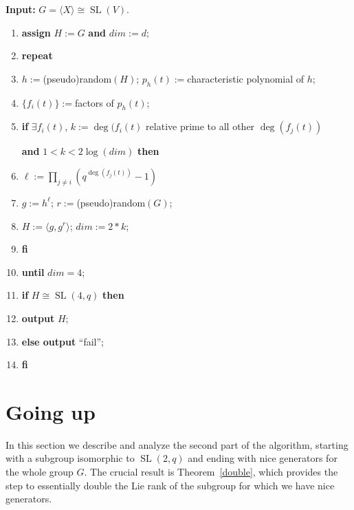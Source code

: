 \documentclass[a4paper,11pt]{article}
\def\SL{\operatorname{SL}}
\renewcommand{\bf}{\textbf} \renewcommand{\L}{\Lambda}
\begin{document}
\noindent
{\bf {Input:}} $G = \langle X \rangle \cong \SL(V)$.
\begin{enumerate}
\item {\bf {assign}} $H := G$ {\bf {and}} $dim := d$;
\item {\bf {repeat}} 
\item \hspace*{1cm} $h:=$(pseudo)random$(H)$; $p_h(t):=$characteristic
polynomial of $h$;
\item \hspace*{1cm} $\{ f_i(t) \}:=$factors of $p_h(t)$;
\item \hspace*{1cm} {\bf {if}} $\exists f_i(t)$, $k:=\deg(f_i(t)$
relative prime to all other $\deg(f_j(t))$

 \hspace*{2cm} {\bf {and}} $1<k<2 \log(dim)$ {\bf {then}}
\item \hspace*{2cm} $\ell:=\prod_{j \ne i} \left(q^{\deg(f_j(t))}-1\right)$
\item \hspace*{2cm} $g:=h^{\ell}$; $r:=$(pseudo)random$(G)$;
\item \hspace*{2cm} $H:=\langle g,g^r \rangle$; $dim := 2*k$;
\item \hspace*{1cm} {\bf {fi}}
\item {\bf {until}} $dim=4$;
\item {\bf {if}} $H \cong \SL(4,q)$ {\bf {then}}
\item \hspace*{1cm} {\bf {output}} $H$;
\item \hspace*{1cm} {\bf {else output}} ``fail'';
\item {\bf {fi}}
\end{enumerate}

\section{Going up}
\label{going up}

In this section we describe and analyze the second part of the
algorithm, starting with a subgroup isomorphic to $\SL(2,q)$ and
ending with nice generators for the whole group $G$. The crucial
result is Theorem~\ref{double}, which provides the step to essentially
double the Lie rank of the subgroup for which we have nice generators.
\end{document}
